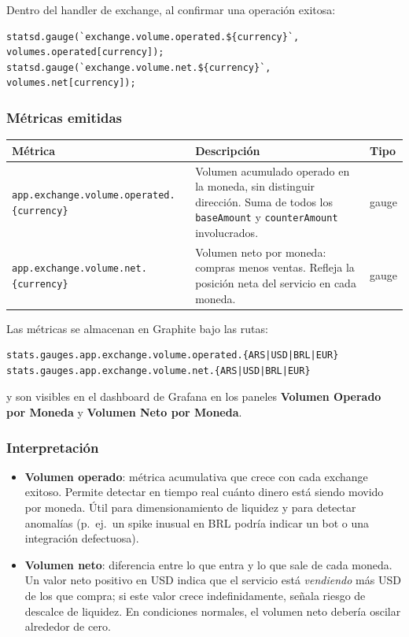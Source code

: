 Dentro del handler de exchange, al confirmar una operación exitosa:

\begin{verbatim}
statsd.gauge(`exchange.volume.operated.${currency}`, volumes.operated[currency]);
statsd.gauge(`exchange.volume.net.${currency}`,     volumes.net[currency]);
\end{verbatim}

\subsubsection{Métricas emitidas}

\begin{table}[H]
\centering
\begin{tabular}{lp{5.5cm}l}
\toprule
\textbf{Métrica} & \textbf{Descripción} & \textbf{Tipo} \\
\midrule
\texttt{app.exchange.volume.operated.\{currency\}} & Volumen acumulado operado en la moneda, sin distinguir dirección. Suma de todos los \texttt{baseAmount} y \texttt{counterAmount} involucrados. & gauge \\
\texttt{app.exchange.volume.net.\{currency\}} & Volumen neto por moneda: compras menos ventas. Refleja la posición neta del servicio en cada moneda. & gauge \\
\bottomrule
\end{tabular}
\end{table}

Las métricas se almacenan en Graphite bajo las rutas:

\begin{verbatim}
stats.gauges.app.exchange.volume.operated.{ARS|USD|BRL|EUR}
stats.gauges.app.exchange.volume.net.{ARS|USD|BRL|EUR}
\end{verbatim}

y son visibles en el dashboard de Grafana en los paneles \textbf{Volumen Operado por Moneda} y \textbf{Volumen Neto por Moneda}.

\subsubsection{Interpretación}

\begin{itemize}[leftmargin=*]
    \item \textbf{Volumen operado}: métrica acumulativa que crece con cada exchange exitoso. Permite detectar en tiempo real cuánto dinero está siendo movido por moneda. Útil para dimensionamiento de liquidez y para detectar anomalías (p.\ ej.\ un spike inusual en BRL podría indicar un bot o una integración defectuosa).
    \item \textbf{Volumen neto}: diferencia entre lo que entra y lo que sale de cada moneda. Un valor neto positivo en USD indica que el servicio está \textit{vendiendo} más USD de los que compra; si este valor crece indefinidamente, señala riesgo de descalce de liquidez. En condiciones normales, el volumen neto debería oscilar alrededor de cero.
\end{itemize}

